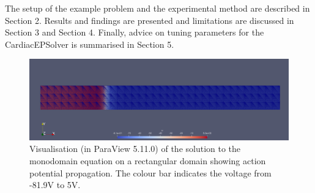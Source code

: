 \par
The setup of the example problem and the experimental method are described in Section 2. Results and findings are presented and limitations are discussed in Section 3 and Section 4. Finally, advice on tuning parameters for the CardiacEPSolver is summarised in Section 5.
\begin{figure}[hb!]
    \centering
    \includegraphics[width=0.7\linewidth]{figs/domain.png}
    \caption{Visualisation (in ParaView 5.11.0) of the solution to the monodomain equation on a rectangular domain showing action potential propagation. The colour bar indicates the voltage from -81.9V to 5V.}
    \label{domain}
\end{figure}
